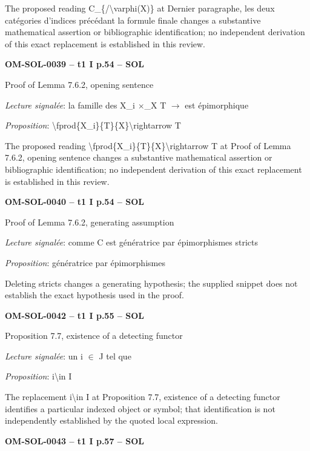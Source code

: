 The proposed reading C\_\{/\textbackslash{}varphi(X)\} at Dernier paragraphe, les deux catégories d'indices précédant la formule finale changes a substantive mathematical assertion or bibliographic identification; no independent derivation of this exact replacement is established in this review.\par
\par\noindent\textbf{OM-SOL-0039 -- t1 I p.54 -- SOL}\par
Proof of Lemma 7.6.2, opening sentence\par
\emph{Lecture signalée}: la famille des X\_i \ensuremath{\times}\_X T \ensuremath{\to} est épimorphique\par
\emph{Proposition}: \textbackslash{}fprod\{X\_i\}\{T\}\{X\}\textbackslash{}rightarrow T\par
The proposed reading \textbackslash{}fprod\{X\_i\}\{T\}\{X\}\textbackslash{}rightarrow T at Proof of Lemma 7.6.2, opening sentence changes a substantive mathematical assertion or bibliographic identification; no independent derivation of this exact replacement is established in this review.\par
\par\noindent\textbf{OM-SOL-0040 -- t1 I p.54 -- SOL}\par
Proof of Lemma 7.6.2, generating assumption\par
\emph{Lecture signalée}: comme C est génératrice par épimorphismes stricts\par
\emph{Proposition}: génératrice par épimorphismes\par
Deleting stricts changes a generating hypothesis; the supplied snippet does not establish the exact hypothesis used in the proof.\par
\par\noindent\textbf{OM-SOL-0042 -- t1 I p.55 -- SOL}\par
Proposition 7.7, existence of a detecting functor\par
\emph{Lecture signalée}: un i \ensuremath{\in} J tel que\par
\emph{Proposition}: i\textbackslash{}in I\par
The replacement i\textbackslash{}in I at Proposition 7.7, existence of a detecting functor identifies a particular indexed object or symbol; that identification is not independently established by the quoted local expression.\par
\par\noindent\textbf{OM-SOL-0043 -- t1 I p.57 -- SOL}\par
